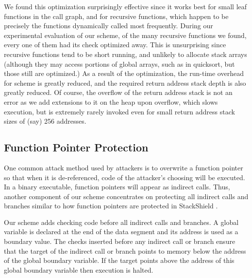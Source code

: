 We found this optimization surprisingly effective since it works best
for small leaf functions in the call graph, and for recursive
functions, which happen to be precisely the functions dynamically
called most frequently.  During our experimental evaluation of our
scheme, of the many recursive functions we found, every one of them
had its check optimized away.  This is unsurprising since recursive
functions tend to be short running, and unlikely to allocate stack
arrays (although they may access portions of global arrays, such as in
quicksort, but those still are optimized.)  As a result of the
optimization, the run-time overhead for scheme is greatly reduced, and
the required return address stack depth is also greatly reduced.  Of
course, the overflow of the return address stack is not an error as we
add extensions to it on the heap upon overflow, which slows execution,
but is extremely rarely invoked even for small return address stack
sizes of (say) 256 addresses.

\subsection{Function Pointer Protection}

One common attack method used by attackers is to overwrite a function
pointer so that when it is de-referenced, code of the attacker's
choosing will be executed. In a binary executable, function pointers
will appear as indirect calls. Thus, another component of our scheme
concentrates on protecting all indirect calls and branches similar to
how function pointers are protected in StackShield \cite{stackshield}.

Our scheme adds checking code before all indirect calls and
branches. A global variable is declared at the end of the data segment
and its address is used as a boundary value. The checks inserted
before any indirect call or branch ensure that the target of the
indirect call or branch points to memory below the address of the
global boundary variable. If the target points above the address of
this global boundary variable then execution is halted.


